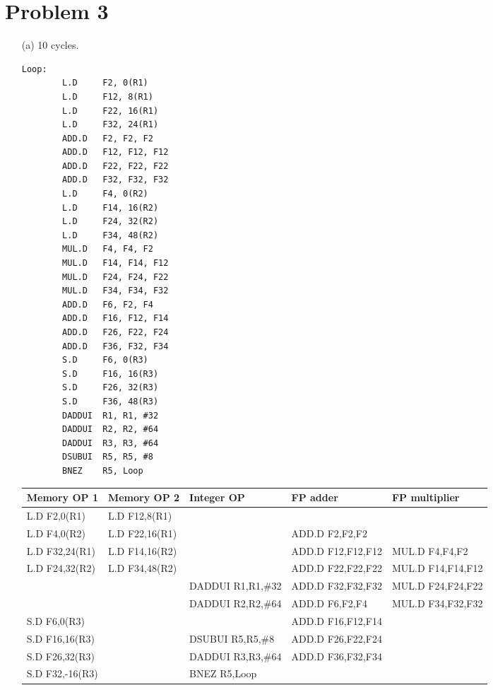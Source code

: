 \documentclass[11pt,leqno]{article}
\begin{document}
\begin{enumerate}
{}
  
\end{enumerate}

\section*{Problem 3}
\begin{enumerate}
\item[(a)] 10 cycles.
{\tiny
\begin{verbatim}
Loop:
        L.D     F2, 0(R1)
        L.D     F12, 8(R1)
        L.D     F22, 16(R1)
        L.D     F32, 24(R1)
        ADD.D   F2, F2, F2
        ADD.D   F12, F12, F12
        ADD.D   F22, F22, F22
        ADD.D   F32, F32, F32
        L.D     F4, 0(R2)
        L.D     F14, 16(R2)
        L.D     F24, 32(R2)
        L.D     F34, 48(R2)
        MUL.D   F4, F4, F2
        MUL.D   F14, F14, F12
        MUL.D   F24, F24, F22
        MUL.D   F34, F34, F32
        ADD.D   F6, F2, F4
        ADD.D   F16, F12, F14
        ADD.D   F26, F22, F24
        ADD.D   F36, F32, F34
        S.D     F6, 0(R3)
        S.D     F16, 16(R3)
        S.D     F26, 32(R3)
        S.D     F36, 48(R3)
        DADDUI  R1, R1, #32
        DADDUI  R2, R2, #64
        DADDUI  R3, R3, #64
        DSUBUI  R5, R5, #8
        BNEZ    R5, Loop
\end{verbatim}
}
{\tiny
\begin{tabular}{|l|l|l|l|l|}
  \hline
  Memory OP 1   & Memory OP 2   & Integer OP    & FP adder              & FP multiplier\\
  \hline
  \hline
  L.D F2,0(R1)  & L.D F12,8(R1) &               &                       & \\
  \hline
  L.D F4,0(R2)  & L.D F22,16(R1)&               & ADD.D F2,F2,F2        & \\
  \hline
  L.D F32,24(R1)& L.D F14,16(R2)&               & ADD.D F12,F12,F12     & MUL.D F4,F4,F2\\
  \hline
  L.D F24,32(R2) & L.D F34,48(R2)&              & ADD.D F22,F22,F22     & MUL.D F14,F14,F12\\
  \hline
                &               & DADDUI R1,R1,\#32& ADD.D F32,F32,F32  & MUL.D F24,F24,F22\\
  \hline
                &               & DADDUI R2,R2,\#64& ADD.D F6,F2,F4     & MUL.D F34,F32,F32\\
  \hline
  S.D F6,0(R3)  &               &               & ADD.D F16,F12,F14  & \\
  \hline
  S.D F16,16(R3)&               & DSUBUI R5,R5,\#8& ADD.D F26,F22,F24   & \\
  \hline
  S.D F26,32(R3)&               & DADDUI R3,R3,\#64& ADD.D F36,F32,F34     & \\
  \hline
  S.D F32,-16(R3)&              & BNEZ R5,Loop  &                       & \\


\end{tabular}}
\end{enumerate}
\end{document}
